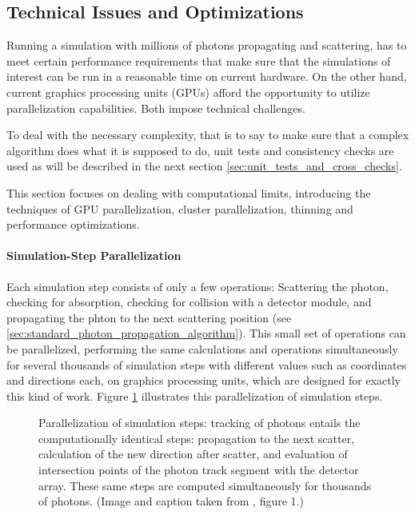 
\subsection{Technical Issues and Optimizations}
\label{sec:technical_issues_and_optimizations}

Running a simulation with millions of photons propagating and scattering, has to meet certain performance requirements that make sure that the simulations of interest can be run in a reasonable time on current hardware. On the other hand, current graphics processing units (GPUs) afford the opportunity to utilize parallelization capabilities. Both impose technical challenges.

To deal with the necessary complexity, that is to say to make sure that a complex algorithm does what it is supposed to do, unit tests and consistency checks are used as will be described in the next section \ref{sec:unit_tests_and_cross_checks}.

This section focuses on dealing with computational limits, introducing the techniques of GPU parallelization, cluster parallelization, thinning and performance optimizations.


\paragraph{Simulation-Step Parallelization}
Each simulation step consists of only a few operations: Scattering the photon, checking for absorption, checking for collision with a detector module, and propagating the phton to the next scattering position (see \ref{sec:standard_photon_propagation_algorithm}). This small set of operations can be parallelized, performing the same calculations and operations simultaneously for several thousands of simulation steps with different values such as coordinates and directions each, on graphics processing units, which are designed for exactly this kind of work. Figure \ref{fig:Id3ioyie} illustrates this parallelization of simulation steps.

\begin{figure}[htbp]
  \caption{Parallelization of simulation steps: tracking of photons entails the computationally identical steps: propagation to the next scatter, calculation of the new direction after scatter, and evaluation of intersection points of the photon track segment with the detector array. These same steps are computed simultaneously for thousands of photons. (Image and caption taken from \cite{ppcpaper}, figure 1.)}
  \label{fig:Id3ioyie}
\end{figure}

